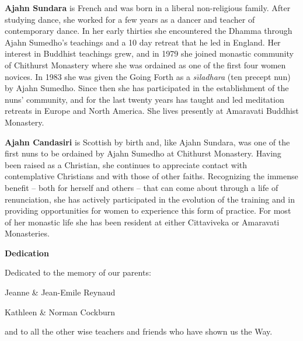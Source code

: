 

\textbf{Ajahn Sundara} is French and was born in a liberal non-religious family. After studying dance, she worked for a few years as a dancer and teacher of contemporary dance. In her early thirties she encountered the Dhamma through Ajahn Sumedho's teachings and a 10 day retreat that he led in England. Her interest in Buddhist teachings grew, and in 1979 she joined monastic community of Chithurst Monastery where she was ordained as one of the first four women novices. In 1983 she was given the Going Forth as a \textit{s\={\i}ladhara} (ten precept nun) by Ajahn Sumedho. Since then she has participated in the establishment of the nuns' community, and for the last twenty years has taught and led meditation retreats in Europe and North America. She lives presently at Amaravati Buddhist Monastery.

\textbf{Ajahn Candasiri} is Scottish by birth and, like Ajahn Sundara, was one of the first nuns to be ordained by Ajahn Sumedho at Chithurst Monastery. Having been raised as a Christian, she continues to appreciate contact with contemplative Christians and with those of other faiths. Recognizing the immense benefit -- both for herself and others -- that can come about through a life of renunciation, she has actively participated in the evolution of the training and in providing opportunities for women to experience this form of practice. For most of her monastic life she has been resident at either Cittaviveka or Amaravati Monasteries.


\textbf{Dedication}

Dedicated to the memory of our parents:

Jeanne \& Jean-Emile Reynaud

Kathleen \& Norman Cockburn

and to all the other wise teachers and friends who have shown us the Way.
